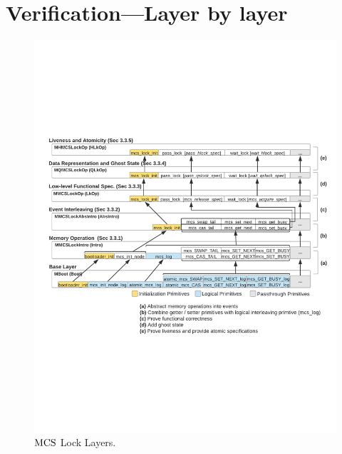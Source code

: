 \section{Verification---Layer by layer}
\label{chapter:mcslock:sec:verification}%

\begin{figure}
\begin{center}
\includegraphics[width=\textwidth]{figs/mcslock/layer_overview}
\end{center}
\caption{$\mathrm{MCS}$ Lock Layers.}
\label{fig:chapter:mcslock:layeroverview}
\end{figure}


